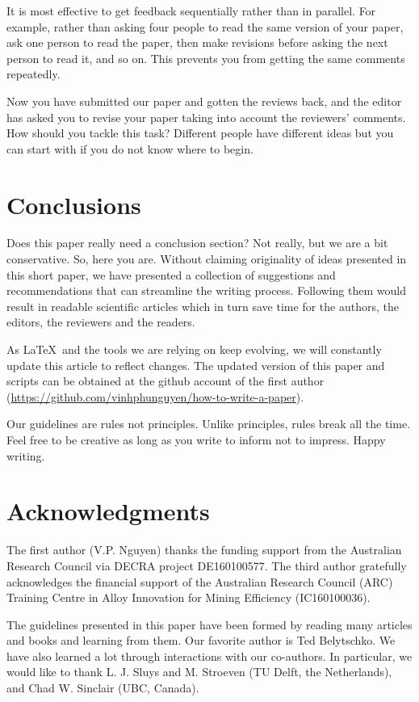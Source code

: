 \documentclass[authoryear,12pta4paper,fleqn]{article}
\numberwithin{equation}{section}
\theoremstyle{remark}
\begin{document}
It is most effective to get feedback sequentially rather than in parallel. For example, rather than asking four people to read the same version of your paper, ask one person to read the paper, then make revisions before asking the next person to read it, and so on. This prevents you from getting the same comments repeatedly.

Now you have submitted our paper and gotten the reviews back, and the editor has asked you to revise your paper taking into account the reviewers' comments. How should you tackle this task? Different people have different ideas but you can start with \cite{noble2017ten} if you do not know where to begin.

\section{Conclusions}

Does this paper really need a conclusion section? Not really, but we are a bit conservative. So, here you are. Without claiming  originality of ideas presented in this short paper, we have presented a collection of  suggestions and recommendations that can streamline the writing process. Following them would result in readable scientific articles which in turn save time for the authors,  the editors, the reviewers and the readers.


As \LaTeX\ and the tools we are relying on keep evolving, we will constantly update this article to reflect changes. The updated version of this paper and scripts can be obtained at the github account of the first author (\url{https://github.com/vinhphunguyen/how-to-write-a-paper}).

Our guidelines are rules not principles. Unlike principles, rules break all the time. Feel free to be creative as long as you write to inform not to impress. Happy writing.

%
\section*{Acknowledgments}

 The first author (V.P. Nguyen) thanks the funding support from the Australian Research Council via DECRA project DE160100577.  The third  author gratefully acknowledges the financial support of the Australian Research Council (ARC) Training Centre in Alloy Innovation for Mining Efficiency (IC160100036).

 The guidelines presented in this paper have been formed by reading many articles and books and learning from them. Our favorite author is Ted Belytschko. We have also learned a lot through interactions with our co-authors. In particular, we would like to thank L. J. Sluys and M. Stroeven (TU Delft, the Netherlands), and Chad W. Sinclair (UBC, Canada).
\end{document}
